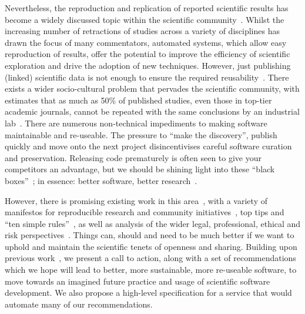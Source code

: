 \documentclass[a4paper,11pt]{article}
\begin{document}
Nevertheless, the reproduction and replication of reported scientific
results has become a widely discussed topic within the scientific
community~\cite{barnes:2010,morin-et-al:2012,joppa-et-al:2013}.
Whilst the increasing number of retractions of studies across a
variety of disciplines has drawn the focus of many commentators,
automated systems, which allow easy reproduction of results, offer the
potential to improve the efficiency of scientific exploration and
drive the adoption of new techniques. However, just publishing
(linked) scientific data is not enough to ensure the required
reusability~\cite{bechhofer-et-al:2013}. There exists a wider
socio-cultural problem that pervades the scientific community, with
estimates that as much as 50\% of published studies, even those in
top-tier academic journals, cannot be repeated with the same
conclusions by an industrial
lab~\cite{osherovich:2011,hesman-saey:2015}. There are numerous
non-technical impediments to making software maintainable and
re-useable. The pressure to ``make the discovery'', publish quickly
and move onto the next project disincentivises careful software
curation and preservation. Releasing code prematurely is often seen to
give your competitors an advantage, but we should be shining light
into these ``black boxes''~\cite{morin-et-al:2012}; in essence: better
software, better research~\cite{goble:2014}.

However, there is promising existing work in this
area~\cite{chirigati-et-al:2013,stodden+miguez:2014,stodden-et-al:2015,stodden-et-al:2016},
with a variety of manifestos for reproducible research and community
initiatives~\cite{rrspecissue:2008,gent:2013,fursin-et-al:2014,Bailey_setthe,james-et-al:2014},
top tips and ``ten simple
rules''~\cite{prlic+proctor:2012,masum-et-al:2013,sandve-et-al:2013,osborne-et-al:2013,goodman-et-al:2014,crick-et-al-irreprod:2015,list-et-al:2017},
as well as analysis of the wider legal, professional, ethical and risk
perspectives~\cite{stodden:2008,haas:2016}. Things can, should and
need to be much better if we want to uphold and maintain the
scientific tenets of openness and sharing. Building upon previous
work~\cite{crick-et-al_wssspe2,crick-et-al_recomp2014}, we present a
call to action, along with a set of recommendations which we hope will
lead to better, more sustainable, more re-useable software, to move
towards an imagined future practice and usage of scientific software
development. We also propose a high-level specification for a service
that would automate many of our recommendations.
\end{document}
